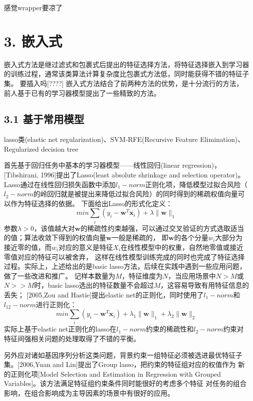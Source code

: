 \documentclass[a4paper,UTF8]{article}
\begin{document}
感觉wrapper要凉了



\section*{3. 嵌入式}

嵌入式方法是继过滤式和包裹式后提出的特征选择方法，将特征选择嵌入到学习器的训练过程，通常该类算法计算复杂度比包裹式方法低，同时能获得不错的特征子集。
要插入吗[????]
嵌入式方法结合了前两种方法的优势，是十分流行的方法，前人基于已有的学习器模型提出了一些精致的方法。

\subsection*{3.1 基于常用模型}

lasso类(elastic net regularization)、SVM-RFE(Recursive Feature Elimination)、Regularized decision tree

首先基于回归任务中基本的学习器模型——线性回归(linear regression)，[Tibshirani, 1996]提出了Lasso(least absolute shrinkage and selection operator)。
Lasso通过在线性回归损失函数中添加$l_{1}-norm$正则化项，降低模型过拟合风险（$l_{2}-norm$的岭回归就是被提出来降低过拟合风险）的同时得到的稀疏权值向量可以作为特征选择的依据。
下面给出Lasso的形式化定义：
$$ min \sum_{i}(y_{i}-\textbf{w}^{T}\textbf{x}_{i})+\lambda \parallel \textbf{w} \parallel _{1} $$
参数$\lambda>0$，该值越大对$\textbf{w}$的稀疏性约束越强，可以通过交叉验证的方式选取适当的值；算法收敛下得到的权值向量$\textbf{w}$一般是稀疏的，
即$\textbf{w}$的各个分量$w_{i}$大部分为接近零的值，而$w_{i}$对应的意义是特征$X_{i}$在线性模型中的权重，自然地零值或接近零值对应的特征可以被舍弃，
这样在线性模型训练完成的同时也完成了特征选择过程。实际上，上述给出的是basic lasso方法，后续在实践中遇到一些应用问题，做了一些改进和推广。
记样本数量为$M$，特征维度为$N$，当应用场景中$N>M$或$N>>M$时，basic lasso选出的特征数量不会超过$M$，这容易导致有用特征信息的丢失；
[2005,Zou and Hastie]提出elastic net的正则化，同时使用了$l_{1}-norm$和$l_{12}-norm$进行正则化：
$$ min \sum_{i}(y_{i}-\textbf{w}^{T}\textbf{x}_{i})+\lambda_{1} \parallel \textbf{w} \parallel _{1} +\lambda_{2} \parallel \textbf{w} \parallel _{2} $$
实际上基于elastic net正则化的lasso在$l_{1}-norm$约束的稀疏性和$l_{2}-norm$约束对特征间强相关问题的处理取得了不错的平衡。

另外应对诸如基因序列分析这类问题，背景约束一组特征必须被选进最优特征子集。[2006,Yuan and Lin]提出了Group lasso，把约束的特征组对应的权值作为
新的正则化项[Model Selection and Estimation in Regression with Grouped Variables]。该方法满足特征组约束条件同时能很好的考虑多个特征
对任务的组合影响，在组合影响成为主导因素的场景中有很好的应用。
\end{document}
